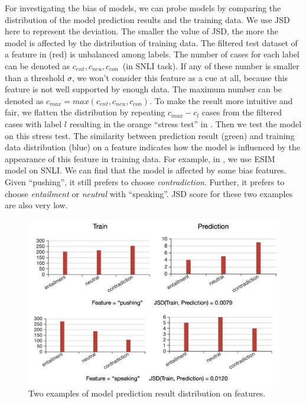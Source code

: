 For investigating the bias of models, we can probe models by  
comparing the distribution of the model prediction results and 
the training data. We use JSD here to represent the deviation. 
The smaller the value of JSD, the more the model is affected 
by the distribution of training data.
The filtered test dataset of a feature in  (red) is unbalanced among 
labels. The number of cases for each label can be denoted as $c_{ent}, c_{neu}, c_{con}$~(in 
SNLI task). If any of these number is smaller than a threshold $\sigma$, 
we won't consider this feature as a cue at all, because
 this feature is not well supported by enough data. 
The maximum number can be denoted as $c_{max}=max(c_{ent}, c_{neu}, c_{con})$.
To make the result more intuitive and fair, 
we flatten the distribution by repeating $c_{max} - c_{l}$ cases from the filtered cases with label $l$ 
resulting in the orange ``stress test'' 
in . 
Then we test the model on this stress test. 
The similarity between prediction result (green) and 
training data distribution (blue) on a feature indicates how the model 
is influenced by the appearance of this feature in training data. 
For example, in , we use 
ESIM~\cite{chen2016enhanced} model on SNLI. 
We can find that the model is affected by some bias features. 
Given ``pushing'', it still prefers to choose \textit{contradiction}. 
Further, it prefers to choose \textit{entailment} or \textit{neutral} with ``speaking''.  
JSD score for these two examples are also very low. 


\begin{figure}[th]
\centering
\includegraphics[width=1.0\columnwidth]{picture/model_result.jpg}
\caption{Two examples of model prediction result distribution on features.}
\label{fig:model_result}
\end{figure}


